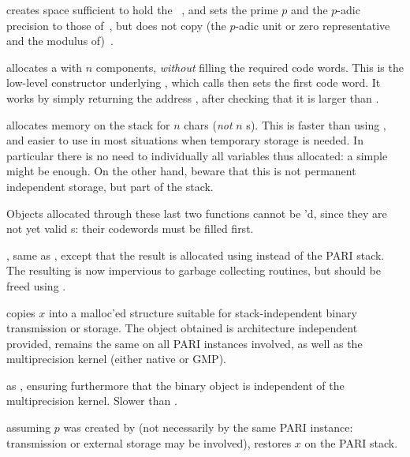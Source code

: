  creates space sufficient to hold the
~, and sets the prime $p$ and the $p$-adic precision to
those of~, but does not copy (the $p$-adic unit or zero representative
and the modulus of)~.

 allocates a  with $n$ components,
\emph{without} filling the required code words. This is the low-level
constructor underlying , which calls  then sets
the first code word. It works by simply returning the address
, after checking that it is larger than .

 allocates memory on the stack for $n$
chars (\emph{not} $n$ s). This is faster than using ,
and easier to use in most situations when temporary storage is needed. In
particular there is no need to  individually all variables thus
allocated: a simple  might be enough. On the other hand,
beware that this is not permanent independent storage, but part of the stack.

\noindent Objects allocated through these last two functions cannot be
'd, since they are not yet valid s: their codewords
must be filled first.

, same as , except
that the result is allocated using  instead of the PARI
stack. The resulting  is now impervious to garbage collecting
routines, but should be freed using .


 copies $x$ into a malloc'ed structure suitable
for stack-independent binary transmission or storage. The object obtained
is architecture independent provided,  remains the same
on all PARI instances involved, as well as the multiprecision kernel (either
native or GMP).

 as , ensuring furthermore
that the binary object is independent of the multiprecision kernel. Slower
than .

 assuming $p$ was created by 
(not necessarily by the same PARI instance: transmission or external storage
may be involved), restores $x$ on the PARI stack.

